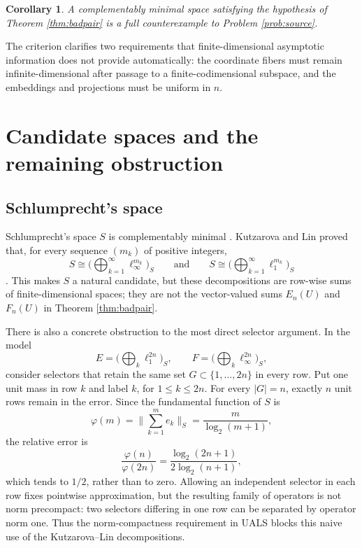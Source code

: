 \documentclass[11pt]{article}
\newtheorem{corollary}[theorem]{Corollary}
\theoremstyle{definition}
\theoremstyle{remark}
\begin{document}
\begin{corollary}\label{cor:target}
A complementably minimal space satisfying the hypothesis of Theorem \ref{thm:badpair} is a full counterexample to Problem \ref{prob:source}.
\end{corollary}

The criterion clarifies two requirements that finite-dimensional asymptotic information does not provide automatically: the coordinate fibers must remain infinite-dimensional after passage to a finite-codimensional subspace, and the embeddings and projections must be uniform in $n$.

\section{Candidate spaces and the remaining obstruction}

\subsection{Schlumprecht's space}

Schlumprecht's space $S$ is complementably minimal \cite{Schlumprecht}.  Kutzarova and Lin proved that, for every sequence $(m_k)$ of positive integers,
\[
  S\cong \Big(\bigoplus_{k=1}^\infty \ell_\infty^{m_k}\Big)_S
  \qquad\text{and}\qquad
  S\cong \Big(\bigoplus_{k=1}^\infty \ell_1^{m_k}\Big)_S
\]
\cite{KL}.  This makes $S$ a natural candidate, but these decompositions are row-wise sums of finite-dimensional spaces; they are not the vector-valued sums $E_n(U)$ and $F_n(U)$ in Theorem \ref{thm:badpair}.

There is also a concrete obstruction to the most direct selector argument.  In the model
\[
  E=\Big(\bigoplus_k\ell_1^{2n}\Big)_S,
  \qquad
  F=\Big(\bigoplus_k\ell_\infty^{2n}\Big)_S,
\]
consider selectors that retain the same set $G\subset\{1,\dots,2n\}$ in every row.  Put one unit mass in row $k$ and label $k$, for $1\leq k\leq2n$.  For every $|G|=n$, exactly $n$ unit rows remain in the error.  Since the fundamental function of $S$ is
\[
  \varphi(m)=\Big\|\sum_{k=1}^m e_k\Big\|_S=\frac{m}{\log_2(m+1)},
\]
the relative error is
\[
  \frac{\varphi(n)}{\varphi(2n)}
  =\frac{\log_2(2n+1)}{2\log_2(n+1)},
\]
which tends to $1/2$, rather than to zero.  Allowing an independent selector in each row fixes pointwise approximation, but the resulting family of operators is not norm precompact: two selectors differing in one row can be separated by operator norm one.  Thus the norm-compactness requirement in UALS blocks this naive use of the Kutzarova--Lin decompositions.
\end{document}
